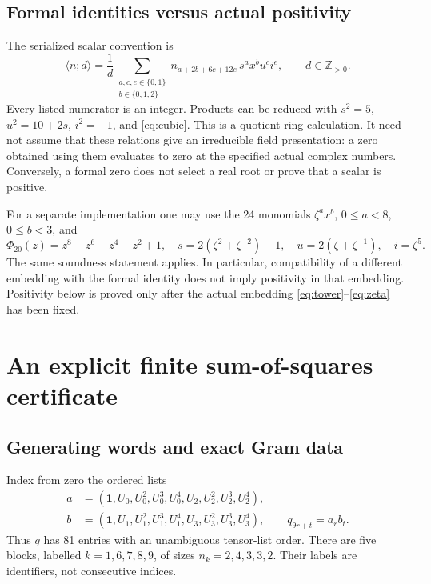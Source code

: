 \documentclass[11pt,a4paper]{article}
\numberwithin{equation}{section}
\theoremstyle{remark}\newtheorem{remark}[theorem]{Remark}
\newcommand{\id}{\mathbf 1}
\begin{document}
\subsection{Formal identities versus actual positivity}\label{sec:ring}
The serialized scalar convention is
\begin{equation}\label{eq:scalar}
 \langle n;d\rangle=
 \frac1d\sum_{\substack{a,c,e\in\{0,1\}\\b\in\{0,1,2\}}}
 n_{a+2b+6c+12e}\,s^ax^bu^ci^e,\qquad d\in\mathbb Z_{>0}.
\end{equation}
Every listed numerator is an integer. Products can be reduced with
$s^2=5$, $u^2=10+2s$, $i^2=-1$, and \eqref{eq:cubic}.
This is a quotient-ring calculation. It need not assume that these relations
give an irreducible field presentation: a zero obtained using them evaluates
to zero at the specified actual complex numbers. Conversely, a formal zero
does not select a real root or prove that a scalar is positive.

For a separate implementation one may use the 24 monomials $\zeta^ax^b$,
$0\leq a<8$, $0\leq b<3$, and
\begin{equation}\label{eq:cyclotomic}
 \Phi_{20}(z)=z^8-z^6+z^4-z^2+1,
 \quad s=2(\zeta^2+\zeta^{-2})-1,\quad u=2(\zeta+\zeta^{-1}),\quad i=\zeta^5.
\end{equation}
The same soundness statement applies. In particular, compatibility of a
different embedding with the formal identity does not imply positivity in
that embedding. Positivity below is proved only after the actual embedding
\eqref{eq:tower}--\eqref{eq:zeta} has been fixed.

\section{An explicit finite sum-of-squares certificate}\label{sec:sos}
\subsection{Generating words and exact Gram data}
Index from zero the ordered lists
\begin{align}
 a&=(\id,U_0,U_0^2,U_0^3,U_0^4,U_2,U_2^2,U_2^3,U_2^4),\\
 b&=(\id,U_1,U_1^2,U_1^3,U_1^4,U_3,U_3^2,U_3^3,U_3^4),
 \qquad q_{9r+t}=a_rb_t.\label{eq:q}
\end{align}
Thus $q$ has 81 entries with an unambiguous tensor-list order.
There are five blocks, labelled $k=1,6,7,8,9$, of sizes
$n_k=2,4,3,3,2$. Their labels are identifiers, not consecutive indices.
\end{document}
